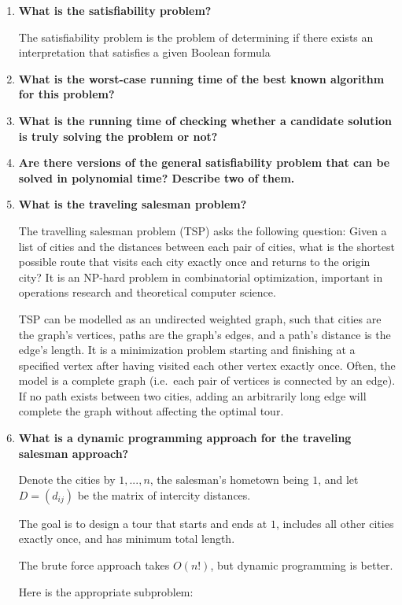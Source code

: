 \documentclass[a4paper,11pt]{article}
\begin{document}
\begin{enumerate}
\def\labelenumi{\arabic{enumi}.}
\item
  \textbf{What is the satisfiability problem?}

  The satisfiability problem is the problem of determining if there
  exists an interpretation that satisfies a given Boolean formula
\item
  \textbf{What is the worst-case running time of the best known
  algorithm for this problem?}
\item
  \textbf{What is the running time of checking whether a candidate
  solution is truly solving the problem or not?}
\item
  \textbf{Are there versions of the general satisfiability problem that
  can be solved in polynomial time? Describe two of them.}
\item
  \textbf{What is the traveling salesman problem?}

  The travelling salesman problem (TSP) asks the following question:
  Given a list of cities and the distances between each pair of cities,
  what is the shortest possible route that visits each city exactly once
  and returns to the origin city? It is an NP-hard problem in
  combinatorial optimization, important in operations research and
  theoretical computer science.

  TSP can be modelled as an undirected weighted graph, such that cities
  are the graph's vertices, paths are the graph's edges, and a path's
  distance is the edge's length. It is a minimization problem starting
  and finishing at a specified vertex after having visited each other
  vertex exactly once. Often, the model is a complete graph (i.e.~each
  pair of vertices is connected by an edge). If no path exists between
  two cities, adding an arbitrarily long edge will complete the graph
  without affecting the optimal tour.
\item
  \textbf{What is a dynamic programming approach for the traveling
  salesman approach?}

  Denote the cities by $1, ..., n$, the salesman's hometown being $1$,
  and let $D = (d_{ij})$ be the matrix of intercity distances.

  The goal is to design a tour that starts and ends at $1$, includes all
  other cities exactly once, and has minimum total length.

  The brute force approach takes $O(n!)$, but dynamic programming is
  better.

  Here is the appropriate subproblem:


\end{enumerate}
\end{document}
